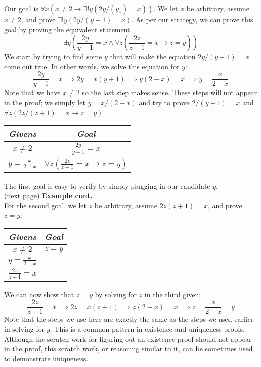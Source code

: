 \documentclass{report}
\theoremstyle{definition}
\begin{document}
Our goal is $\forall x(x\neq 2\to\exists!y(2y/(y_1)=x))$. We let $x$ be arbitrary, assume $x\neq2$, and prove $\exists!y(2y/(y+1)=x)$. 
As per our strategy, we can prove this goal by proving the equivalent statement
\begin{equation*}
\exists y\left(\frac{2y}{y+1}=x\land\forall z\left(\frac{2z}{z+1}=x\to z=y\right)\right)
\end{equation*}
We start by trying to find some $y$ that will make the equation $2y/(y+1)=x$ come out true. In other words, we solve this equation for $y$:
\begin{equation*}
\frac{2y}{y+1}=x\implies2y=x(y+1)\implies y(2-x)=x\implies y=\frac{x}{2-x}
\end{equation*}
Note that we have $x\neq2$ so the last step makes sense. These steps will not appear in the proof; we simply let $y=x/(2-x)$ and try to prove $2/(y+1)=x$ and $\forall z(2z/(z+1)=x\to z=y)$.
\begin{center}
\begin{tabular}{c|c}
\textit{Givens}&\textit{Goal}\\
\hline
$x\neq2$&$\frac{2y}{y+1}=x$\\
$y=\frac{x}{2-x}$&$\forall z\left(\frac{2z}{z+1}=x\to z=y\right)$
\end{tabular}
\end{center}
The first goal is easy to verify by simply plugging in our candidate $y$.\\
(next page)\newpage
\noindent\textbf{Example cont.}\\
For the second goal, we let $z$ be arbitrary, assume $2z(z+1)=x$, and prove $z=y$:
\begin{center}
\begin{tabular}{c|c}
\textit{Givens}&\textit{Goal}\\
\hline
$x\neq2$&$z=y$\\
$y=\frac{x}{2-x}$&\\
$\frac{2z}{z+1}=x$&
\end{tabular}
\end{center}
We can now show that $z=y$ by solving for $z$ in the third given:
\begin{equation*}
\frac{2z}{z+1}=x\implies2z=x(z+1)\implies z(2-x)=x\implies z=\frac{x}{2-x}=y
\end{equation*}
Note that the steps we use here are exactly the same as the steps we used earlier in solving for $y$. This is a common pattern in existence and uniqueness proofs. Although the scratch
work for figuring out an existence proof should not appear in the proof, this scratch work, or reasoning similar to it, can be sometimes used to demonstrate uniqueness.\\
\end{document}
